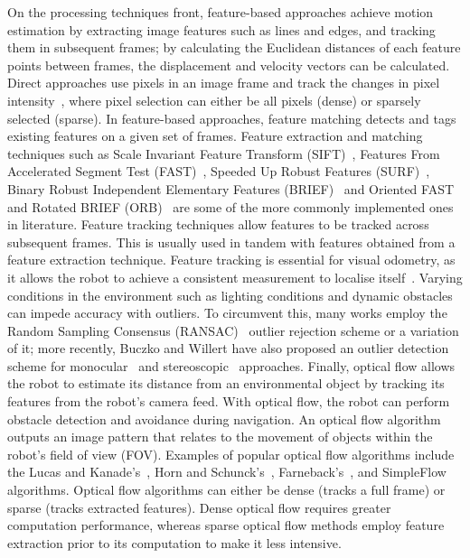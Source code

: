 On the processing techniques front, feature-based approaches achieve motion estimation by extracting image features such as lines and edges, and tracking them in subsequent frames; by calculating the Euclidean distances of each feature points between frames, the displacement and velocity vectors can be calculated. Direct approaches use pixels in an image frame and track the changes in pixel intensity~\cite{valiente_garcia_visual_2012}, where pixel selection can either be all pixels (dense) or sparsely selected (sparse). In feature-based approaches, feature matching detects and tags existing features on a given set of frames. Feature extraction and matching techniques such as Scale Invariant Feature Transform (SIFT)~\cite{lowe_distinctive_2004}, Features From Accelerated Segment Test (FAST)~\cite{rosten_machine_2006}, Speeded Up Robust Features (SURF)~\cite{bay_speeded-up_2008}, Binary Robust Independent Elementary Features (BRIEF)~\cite{calonder_brief:_2010} and Oriented FAST and Rotated BRIEF (ORB)~\cite{e._rublee_orb:_2011} are some of the more commonly implemented ones in literature. Feature tracking techniques allow features to be tracked across subsequent frames. This is usually used in tandem with features obtained from a feature extraction technique. Feature tracking is essential for visual odometry, as it allows the robot to achieve a consistent measurement to localise itself~\cite{yousif_overview_2015}. Varying conditions in the environment such as lighting conditions and dynamic obstacles can impede accuracy with outliers. To circumvent this, many works employ the Random Sampling Consensus (RANSAC)~\cite{martin_a._fischler_random_1981} outlier rejection scheme or a variation of it; more recently, Buczko and Willert have also proposed an outlier detection scheme for monocular~\cite{buczko_monocular_2017} and stereoscopic~\cite{buczko_how_2016} approaches. Finally, optical flow allows the robot to estimate its distance from an environmental object by tracking its features from the robot's camera feed. With optical flow, the robot can perform obstacle detection and avoidance during navigation. An optical flow algorithm outputs an image pattern that relates to the movement of objects within the robot's field of view (FOV). Examples of popular optical flow algorithms include the Lucas and Kanade's~\cite{bruce_iterative_1981}, Horn and Schunck's~\cite{horn_determining_1981}, Farneback's~\cite{farneback_two-frame_2003}, and SimpleFlow~\cite{tao_simpleflow:_2012} algorithms. Optical flow algorithms can either be dense (tracks a full frame) or sparse (tracks extracted features). Dense optical flow requires greater computation performance, whereas sparse optical flow methods employ feature extraction prior to its computation to make it less intensive. 

